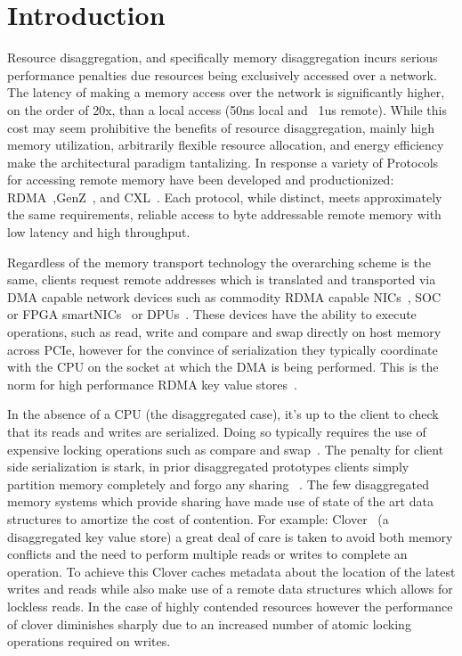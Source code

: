 \section{Introduction}

Resource disaggregation, and specifically memory disaggregation incurs serious
performance penalties due resources being exclusively accessed over a network.
The latency of making a memory access over the network is significantly higher,
on the order of 20x, than a local access (50ns local and ~1us remote).  While
this cost may seem prohibitive the benefits of resource disaggregation, mainly
high memory utilization, arbitrarily flexible resource allocation, and energy
efficiency~\cite{zombieland} make the architectural paradigm tantalizing. In
response a variety of Protocols for accessing remote memory have been developed
and productionized: RDMA~\cite{infiniband-spec},GenZ~\cite{genz}, and
CXL~\cite{cxl}.
Each protocol, while distinct, meets approximately the same requirements,
reliable access to byte addressable remote memory with low latency and high
throughput.

Regardless of the memory transport technology the overarching scheme is the
same, clients request remote addresses which is translated and transported via  
DMA capable network devices such as commodity RDMA capable NICs~\cite{connectx},
SOC~\cite{cavium} or FPGA smartNICs~\cite{corundum,kv-direct} or
DPUs~\cite{fungible}.  These devices have the ability to execute operations,
such as read, write and compare and swap directly on host memory across PCIe,
however for the convince of serialization they typically coordinate with the CPU
on the socket at which the DMA is being performed. This is the norm for high
performance RDMA key value stores~\cite{cliquemap,erpc,herd,sonuma,storm}. 

In the absence of a CPU (the disaggregated case), it's up to the client to check
that its reads and writes are serialized. Doing so typically requires the use of
expensive locking operations such as compare and
swap~\cite{design-guidelines,clover}.  The penalty for client side serialization
is stark, in prior disaggregated prototypes clients simply partition memory
completely and forgo any sharing ~\cite{reigons,fastswap, legoos}. The few
disaggregated memory systems which provide sharing have made use of state of the
art data structures to amortize the cost of contention. For example:
Clover~\cite{clover} (a disaggregated key value store) a great deal of care is
taken to avoid both memory conflicts and the need to perform multiple reads or
writes to complete an operation. To achieve this Clover caches metadata about
the location of the latest writes and reads while also make use of a remote data
structures which allows for lockless reads. In the case of highly contended
resources however the performance of clover diminishes sharply due to an
increased number of atomic locking operations required on writes.

